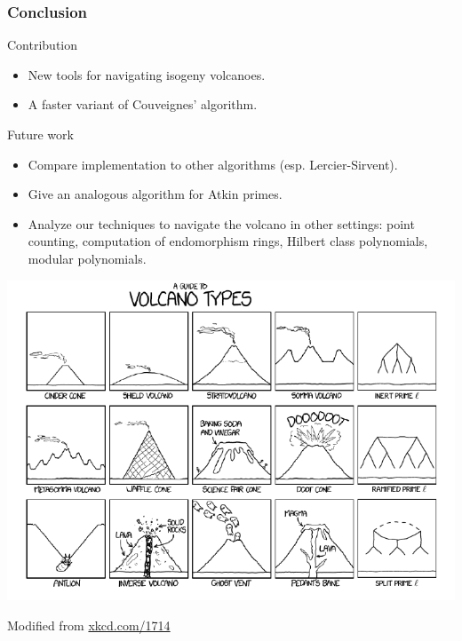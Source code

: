 \documentclass[10pt]{beamer}
\theoremstyle{plain}
\theoremstyle{definition}
\theoremstyle{definition}
\theoremstyle{definition}
\theoremstyle{definition}
\theoremstyle{remark}
\theoremstyle{remark}
\newcommand{\orangebox}[2]{\begin{block}{#1}#2\end{block}}
\begin{document}

\begin{frame}
  \frametitle{Conclusion}
  \orangebox{Contribution}{
    \begin{itemize}
    \item New tools for navigating isogeny volcanoes. 

    \item A faster variant of Couveignes' algorithm.

    \end{itemize}
  }
  \orangebox{Future work}{
    \begin{itemize}
    \item Compare implementation to other algorithms (esp. Lercier-Sirvent).
    \item Give an analogous algorithm for Atkin primes.
    \item Analyze our techniques to navigate the volcano in other
      settings: point counting, computation of endomorphism rings, Hilbert
      class polynomials, modular polynomials.
    \end{itemize}}

\end{frame}


\begin{frame}
  \begin{center}
    \includegraphics[width=.9\hsize]{Images/volcan}
  \end{center}
  \tiny Modified from  \href{http://xkcd.com/1714/}{xkcd.com/1714}
\end{frame}
\end{document}

